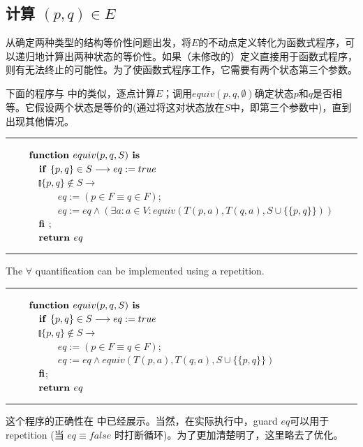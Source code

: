 \subsection{计算 $ (p,q) \in E $}

从确定两种类型的结构等价性问题出发，将$E$的不动点定义转化为函数式程序，可以递归地计算出两种状态的等价性。如果（未修改的）定义直接用于函数式程序，则有无法终止的可能性。为了使函数式程序工作，它需要有两个状态第三个参数。

下面的程序与 \cite{t-Ei91} 中的类似，逐点计算$E$；调用$equiv(p,q,\emptyset)$确定状态$p$和$q$是否相等。它假设两个状态是等价的(通过将这对状态放在$S$中，即第三个参数中)，直到出现其他情况。
\newline
\rule{\textwidth}{1pt}
\mbox{　　} $\mbox{\textbf{function }} equiv (p,q,S) \mbox{\textbf{ is }}$ \\
\mbox{　　　} $ \mbox{\textbf{if }} \{ p,q \} \in S \longrightarrow eq := true $ \\
\mbox{　　　} $ \talloblong \{ p,q \} \not\in S \longrightarrow $ \\
\mbox{　　　　　} $ eq := ( p \in F \equiv q \in F ) $; \\
\mbox{　　　　　} $ eq := eq \land (\exists a:a \in V : equiv (T(p,a),T(q,a),S \cup \{ \{ p,q\} \}  ) )  $ \\
\mbox{　　　} $\mbox{\textbf{fi}}$ ;\\
\mbox{　　　} $\mbox{\textbf{return }} eq$ \\
\rule{\textwidth}{1pt}
The $\forall$ quantification can be implemented using a repetition.
\newline
\rule{\textwidth}{1pt}
\mbox{　　} $\mbox{\textbf{function }} equiv (p,q,S) \mbox{\textbf{ is }}$ \\
\mbox{　　　} $ \mbox{\textbf{if }} \{ p,q \} \in S \longrightarrow eq := true $ \\
\mbox{　　　} $ \talloblong \{ p,q \} \not\in S \longrightarrow $ \\
\mbox{　　　　　} $ eq := ( p \in F \equiv q \in F ) $; \\
\mbox{　　　　　} $ eq := eq \land equiv (T(p,a),T(q,a),S \cup \{ \{ p,q\} \}  )   $ \\
\mbox{　　　} $\mbox{\textbf{fi}}$; \\
\mbox{　　　} $\mbox{\textbf{return }} eq$ \\
\rule{\textwidth}{1pt}
这个程序的正确性在 \cite{t-Ei91} 中已经展示。当然，在实际执行中，guard $eq$可以用于 repetition (当 $eq \equiv false$ 时打断循环)。为了更加清楚明了，这里略去了优化。

